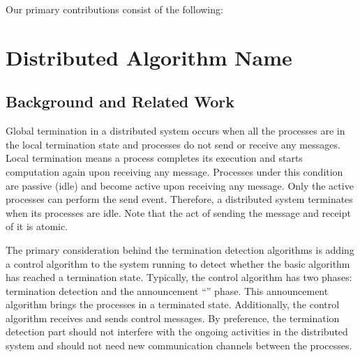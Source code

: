 \documentclass[letterpaper,10pt,english]{sphinxmanual}
\begin{document}
\sphinxAtStartPar
Our primary contributions consist of the following:

\sphinxstepscope


\section{Distributed Algorithm Name}
\label{\detokenize{docs/ShavitFranchezAlg/algorithm:shavitfranchezalg}}\label{\detokenize{docs/ShavitFranchezAlg/algorithm::doc}}

\subsection{Background and Related Work}
\label{\detokenize{docs/ShavitFranchezAlg/algorithm:background-and-related-work}}
\sphinxAtStartPar
Global termination in a distributed system occurs when all the processes are in the local termination state and processes do not send or receive any messages. Local termination means a process completes its execution and starts computation again upon receiving any message. Processes under this condition are passive (idle) and become active upon receiving any message. Only the active processes can perform the send event. Therefore, a distributed system terminates when its processes are idle. Note that the act of sending the message and receipt of it is atomic.

\sphinxAtStartPar
The primary consideration behind the termination detection algorithms is adding a control algorithm to the system running to detect whether the basic algorithm has reached a termination state.  Typically, the control algorithm has two phases: termination detection and the announcement “” phase. This announcement algorithm brings the processes in a terminated state. Additionally, the control algorithm receives and sends control messages.  By preference, the termination detection part should not interfere with the ongoing activities in the distributed system and should not need new communication channels between the processes.
\end{document}
